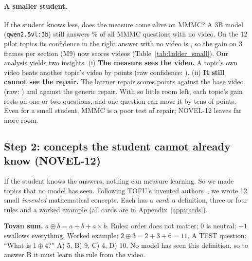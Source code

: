 \documentclass[11pt]{article}
\begin{document}
\DiagLadder


\paragraph{A smaller student.} If the student knows less, does the measure come alive on MMMC? A 3B model
(\texttt{qwen2.5vl:3b}) still answers \mmmcpriorQwenSmallAcc\% of all MMMC questions with no video. On the 12 pilot
topics its confidence in the right answer with no video is \LadSmallSBlind{}, so the gain on 3 frames per section (M9)
now scores \LadSmallDefinedNine{} videos (Table~\ref{tab:ladder_small}). Our analysis yields two insights.
(i) \textbf{The measure sees the video.} A topic's own video beats another topic's video by \LadSmallSepNine{} points
(raw confidence: \LadSmallSepRawNine{}).
(ii) \textbf{It still cannot see the repair.} The learner repair scores \LadSmallLBNine{} points against the base video
(raw: \LadSmallLBRawNine{}) and \LadSmallLGNine{} against the generic repair. With so little room left, each topic's
gain rests on one or two questions, and one question can move it by tens of points. Even for a small student, MMMC
is a poor test of repair; NOVEL-12 leaves far more room.



\subsection{Step 2: concepts the student cannot already know (NOVEL-12)}

If the student knows the answers, nothing can measure learning. So we made topics that no model has seen. Following
TOFU's invented authors~\cite{tofu}, we wrote 12 small \emph{invented} mathematical concepts. Each has a \emph{card}:
a definition, three or four rules and a worked example (all cards are in Appendix~\ref{app:cards}).

\begin{example}
\textbf{Tovan sum.} $a \oplus b = a + b + a \times b$. Rules: order does not matter; 0 is neutral; $-1$ swallows
everything. Worked example: $2 \oplus 3 = 2 + 3 + 6 = 11$.
A TEST question: ``What is $1 \oplus 4$?'' A) 5, B) 9, C) 4, D) 10. No model has seen this definition, so to answer B
it must learn the rule from the video.
\end{example}
\end{document}
